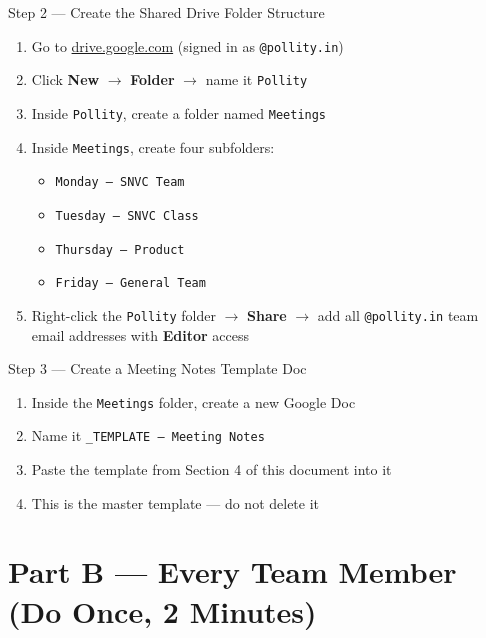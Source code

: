\documentclass[11pt, a4paper]{article}
\begin{document}
\begin{stepbox}{Step 2 — Create the Shared Drive Folder Structure}
\begin{enumerate}[leftmargin=1.5em]
  \item Go to \href{https://drive.google.com}{drive.google.com} (signed in as \texttt{@pollity.in})
  \item Click \textbf{New} $\to$ \textbf{Folder} $\to$ name it \texttt{Pollity}
  \item Inside \texttt{Pollity}, create a folder named \texttt{Meetings}
  \item Inside \texttt{Meetings}, create four subfolders:
  \begin{itemize}
    \item \texttt{Monday -- SNVC Team}
    \item \texttt{Tuesday -- SNVC Class}
    \item \texttt{Thursday -- Product}
    \item \texttt{Friday -- General Team}
  \end{itemize}
  \item Right-click the \texttt{Pollity} folder $\to$ \textbf{Share} $\to$ add all \texttt{@pollity.in} team email addresses with \textbf{Editor} access
\end{enumerate}
\end{stepbox}

\vspace{1em}

\begin{stepbox}{Step 3 — Create a Meeting Notes Template Doc}
\begin{enumerate}[leftmargin=1.5em]
  \item Inside the \texttt{Meetings} folder, create a new Google Doc
  \item Name it \texttt{\_TEMPLATE -- Meeting Notes}
  \item Paste the template from Section 4 of this document into it
  \item This is the master template --- do not delete it
\end{enumerate}
\end{stepbox}

\newpage

\section{Part B — Every Team Member (Do Once, 2 Minutes)}
\end{document}
